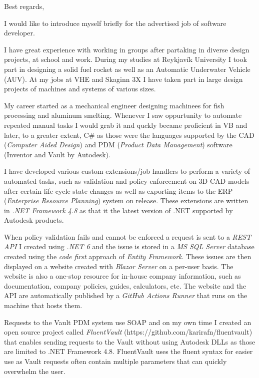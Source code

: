 \documentclass[11pt,a4paper,sans]{moderncv}
\begin{document}
{
    \fancyfoot[r]{}
    \setcounter{page}{0}
    \date{\today}
    \closing{Best regards,}
    
    \makelettertitle

    I would like to introduce myself briefly for the advertised job of software developer.

    I have great experience with working in groups after partaking in diverse design projects, at school and work. During my studies at Reykjavík University I took part in designing a solid fuel rocket as well as an Automatic Underwater Vehicle (AUV). At my jobs at VHE and Skaginn 3X I have taken part in large design projects of machines and systems of various sizes.

    My career started as a mechanical engineer designing machinees for fish processing and aluminum smelting. Whenever I saw oppurtunity to automate repeated manual tasks I would grab it and quckly became proficient in VB and later, to a greater extent, C\# as those were the languages supported by the CAD (\emph{Computer Aided Design}) and PDM (\emph{Product Data Management}) software (Inventor and Vault by Autodesk).
    
    I have developed various custom extensions/job handlers to perform a variety of automated tasks, such as validation and policy enforcement on 3D CAD models after certain life cycle state changes as well as exporting items to the ERP (\emph{Enterprise Resource Planning}) system on release. These extensions are written in \emph{.NET Framework 4.8} as that it the latest version of .NET supported by Autodesk products.
    
    When policy validation fails and cannot be enforced a request is sent to a \emph{REST API} I created using \emph{.NET 6} and the issue is stored in a \emph{MS SQL Server} database created using the \emph{code first} approach of \emph{Entity Framework}. These issues are then displayed on a website created with \emph{Blazor Server} on a per-user basis. The website is also a one-stop resource for in-house company information, such as documentation, company policies, guides, calculators, etc. The website and the API are automatically published by a \emph{GitHub Actions Runner} that runs on the machine that hosts them.

    Requests to the Vault PDM system use SOAP and on my own time I created an open source project called \emph{FluentVault} (https://github.com/karirafn/fluentvault) that enables sending requests to the Vault without using Autodesk DLLs as those are limited to .NET Framework 4.8. FluentVault uses the fluent syntax for easier use as Vault requests often contain multiple parameters that can quickly overwhelm the user.

}
\end{document}
